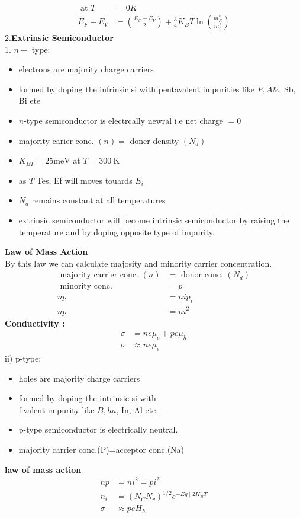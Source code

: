 \begin{itemize}
\begin{align*}
		\text { at } T&=0 K\\
		E_{F}-E_{V}&=\left(\frac{E_{C}-E_{V}}{2}\right)+\frac{3}{4} K_{B} T \ln \left(\frac{m_{R}^{*}}{m_{e}^{*}}\right)
		\end{align*}
	2.\textbf{Extrinsic Semiconductor}\\
	1. $n-$ type:
	\begin{itemize}
		\item  electrons are majority charge carriers\\
		\item formed by doping the infrinsic si with pentavalent impurities like $P, A \&$, Sb, Bi ete
		\item $n$-type semiconductor is electrcally newral i.e net charge $=0$\\
		\item majority carier conc. $(n)=$ doner density $\left(N_{d}\right)$\\
		\item $K_{B T}=25 \mathrm{meV}$ at $T=300 \mathrm{~K}$\\
		\item as $T$ Tes, Ef will moves touards $E_{i}$\\
		\item $N_{d}$ remains constant at all temperatures\\
		\item extrinsic semiconductor will become intrinsic semiconductor by raising the temperature and by doping opposite type of impurity.
	\end{itemize}
	\textbf{Law of Mass Action}\\
	By this law we can calculate majosity and minority carrier concentration.
	\begin{align*}
	\text { majority carrier conc. }(n)&=\text { donor conc. }\left(N_{d}\right)\\
	\text { minority conc.}&= p\\
	n p&=n i p_{i}\\
	n p&=n i^{2}
	\end{align*}
	\textbf{Conductivity :}
	\begin{align*}
	\sigma&=n e \mu_{e}+p e \mu_{h} \\
	\sigma &\approx n e \mu_{e}
	\end{align*}
	ii) p-type: 
	\begin{itemize}
		\item holes are majority charge carriers 
		\item formed by doping the intrinsic si with\\
		fivalent impurity like $B, h a$, In, Al ete.
		\item p-type semiconductor is electrically neutral.
		\item majority carrier conc.(P)=acceptor conc.(Na)
	\end{itemize}
	\textbf{law of mass action}
	\begin{align*}
		n p&=n i^{2}=p i^{2}\\
		n_{i}&=\left(N_{C} N_{v}\right)^{1 / 2} e^{-E g \mid 2 K_{B} T}\\
		\sigma &\approx p e H_{h}
	\end{align*}
\end{itemize}
